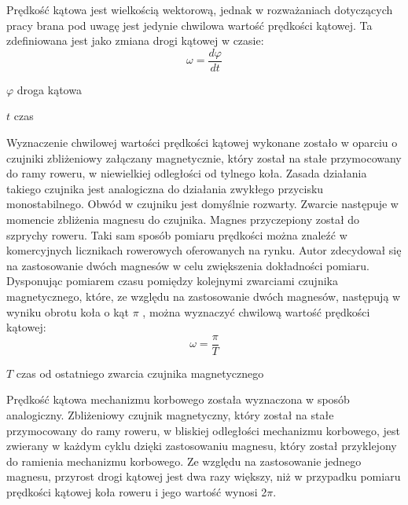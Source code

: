 Prędkość kątowa jest wielkością wektorową, jednak w rozważaniach dotyczących pracy brana pod uwagę jest jedynie chwilowa wartość prędkości kątowej. Ta zdefiniowana jest jako zmiana drogi kątowej w czasie:
\begin{equation}
\omega = \frac{d\varphi}{dt}
\end{equation}
\begin{eqwhere}[2cm]
	\item[$\varphi$] droga kątowa
	\item[$t$] czas
\end{eqwhere}
Wyznaczenie chwilowej wartości prędkości kątowej wykonane zostało w oparciu o czujniki zbliżeniowy załączany magnetycznie, który został na stałe przymocowany do ramy roweru, w niewielkiej odległości od tylnego koła. Zasada działania takiego czujnika jest analogiczna do działania zwykłego przycisku monostabilnego. Obwód w czujniku jest domyślnie rozwarty. Zwarcie następuje w momencie zbliżenia magnesu do czujnika. Magnes przyczepiony został do szprychy roweru. Taki sam sposób pomiaru prędkości można znaleźć w komercyjnych licznikach rowerowych oferowanych na rynku. Autor zdecydował się na zastosowanie dwóch magnesów w celu zwiększenia dokładności pomiaru. Dysponując pomiarem czasu pomiędzy kolejnymi zwarciami czujnika magnetycznego, które, ze względu na zastosowanie dwóch magnesów, następują w wyniku obrotu koła o kąt $\pi$ , można wyznaczyć chwilową wartość prędkości kątowej: 
\begin{equation}
\omega = \frac{\pi}{T}
\end{equation}
\begin{eqwhere}[2cm]
	\item[$T$] czas od ostatniego zwarcia czujnika magnetycznego
\end{eqwhere}
Prędkość kątowa mechanizmu korbowego została wyznaczona w sposób analogiczny. Zbliżeniowy czujnik magnetyczny, który został na stałe przymocowany do ramy roweru, w bliskiej odległości mechanizmu korbowego, jest zwierany w każdym cyklu dzięki zastosowaniu magnesu, który został przyklejony do ramienia mechanizmu korbowego. Ze względu na zastosowanie jednego magnesu, przyrost drogi kątowej jest dwa razy większy, niż w przypadku pomiaru prędkości kątowej koła roweru i jego wartość wynosi 2$\pi$.

